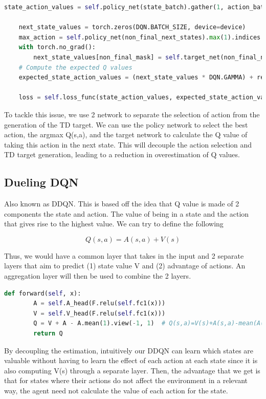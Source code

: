 \documentclass{article}
\begin{document}
\begin{lstlisting}[language=python]
    state_action_values = self.policy_net(state_batch).gather(1, action_batch) # Q(s,a)

    next_state_values = torch.zeros(DQN.BATCH_SIZE, device=device)
    max_action = self.policy_net(non_final_next_states).max(1).indices.view(-1, 1)
    with torch.no_grad():
        next_state_values[non_final_mask] = self.target_net(non_final_next_states).gather(1, max_action).flatten()
    # Compute the expected Q values
    expected_state_action_values = (next_state_values * DQN.GAMMA) + reward_batch

    loss = self.loss_func(state_action_values, expected_state_action_values.unsqueeze(1))
\end{lstlisting}

To tackle this issue, we use 2 network to separate the selection of action from
the generation of the TD target. We can use the policy network to select the best
action, the argmax Q(s,a), and the target network to calculate the Q value of taking
this action in the next state. This will decouple the action selection and TD target
generation, leading to a reduction in overestimation of Q values.

\subsection*{Dueling DQN}

Also known as DDQN. This is based off the idea that Q value is made of 2 components
the state and action. The value of being in a state and the action that gives rise
to the highest value. We can try to define the following

\[
    Q(s,a) = A(s,a) + V(s)
\]

Thus, we would have a common layer that takes in the input and 2 separate layers
that aim to predict (1) state value V and (2) advantage of actions. An aggregation
layer will then be used to combine the 2 layers.

\begin{lstlisting}[language=python]
    def forward(self, x):
        A = self.A_head(F.relu(self.fc1(x)))
        V = self.V_head(F.relu(self.fc1(x)))
        Q = V + A - A.mean(1).view(-1, 1)  # Q(s,a)=V(s)+A(s,a)-mean(A(s,a))
        return Q
\end{lstlisting}

By decoupling the estimation, intuitively our DDQN can learn which states are
valuable without having to learn the effect of each action at each state
since it is also computing V(s) through a separate layer. Then, the advantage
that we get is that for states where their actions do not affect the environment
in a relevant way, the agent need not calculate the value of each action for the
state.
\end{document}
